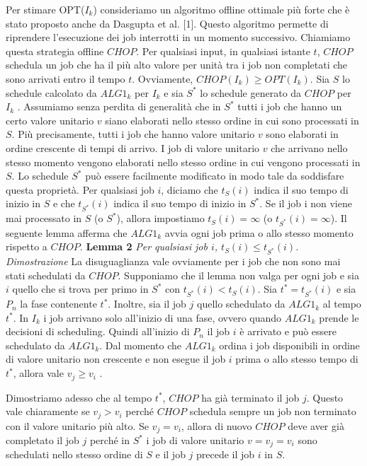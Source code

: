 \documentclass[twoside,openany,titlepage,fleqn,
	headinclude,12pt,a4paper,BCOR5mm,footinclude]{scrbook}
\begin{document}
Per stimare OPT($I_{k}$) consideriamo un algoritmo offline ottimale più forte che è stato proposto anche da Dasgupta et al. [1]. Questo algoritmo permette di riprendere l'esecuzione dei job interrotti in un momento successivo. Chiamiamo questa strategia offline $CHOP$. Per qualsiasi input, in qualsiasi istante $t$, $CHOP$ schedula un job che ha il più alto valore per unità tra i job non completati che sono arrivati entro il tempo $t$. Ovviamente, $CHOP(I_{k}) \geq OPT(I_{k})$. Sia $S$ lo schedule calcolato da $ALG1_{k}$ per $I_{k}$ e sia $S^{*}$ lo schedule generato da $CHOP$ per $I_{k}$ . Assumiamo senza perdita di generalità che in $S^{*}$ tutti i job che hanno un certo valore unitario $v$ siano elaborati nello stesso ordine in cui sono processati in $S$. Più precisamente, tutti i job che hanno valore unitario $v$ sono elaborati in ordine crescente di tempi di arrivo. I job di valore unitario $v$ che arrivano nello stesso momento vengono elaborati nello stesso ordine in cui vengono processati in $S$. Lo schedule $S^{*}$ può essere facilmente modificato in modo tale da soddisfare questa proprietà. Per qualsiasi job $i$, diciamo che $t_{S}(i)$ indica il suo tempo di inizio in $S$ e che $t_{S^{*}}(i)$ indica il suo tempo di inizio in $S^{*}$. Se il job i non viene mai processato in $S$ (o $S^{*}$), allora impostiamo $t_{S}(i) = \infty$ (o $t_{S^{*}} (i) = \infty$). Il seguente lemma afferma che $ALG1_{k}$ avvia ogni job prima o allo stesso momento rispetto a $CHOP$.\newline\newline
\textbf{Lemma 2} 
\textit{Per qualsiasi job $i$, $t_{S}(i) \leq t_{S^{*}}(i)$.}\newline\newline
\textit{Dimostrazione}
La disuguaglianza vale ovviamente per i job che non sono mai stati schedulati da $CHOP$. Supponiamo che il lemma non valga per ogni job e sia $i$ quello che si trova per primo in $S^{*}$ con $t_{S^{*}}(i) < t_{S}(i)$. Sia $t^{*} = t_{S^{*}} (i)$ e sia $P_{n}$ la fase contenente $t^{*}$. Inoltre, sia il job $j$ quello schedulato da $ALG1_{k}$ al tempo $t^{*}$. In $I_{k}$ i job arrivano solo all'inizio di una fase, ovvero quando $ALG1_{k}$ prende le decisioni di scheduling. Quindi all'inizio di $P_{n}$ il job $i$ è arrivato e può essere schedulato da $ALG1_{k}$. Dal momento che $ALG1_{k}$ ordina i job disponibili in ordine di valore unitario non crescente e non esegue il job $i$ prima o allo stesso tempo di $t^{*}$, allora vale $v_{j} \geq v_{i}$ . 

Dimostriamo adesso che al tempo $t^{*}$, $CHOP$ ha già terminato il job $j$. Questo vale chiaramente se $v_{j} > v_{i}$ perché $CHOP$ schedula sempre un job non terminato con il valore unitario più alto. Se $v_{j} = v_{i}$, allora di nuovo $CHOP$ deve aver già completato il job $j$ perché in $S^{*}$ i job di valore unitario $v = v_{j} = v_{i}$ sono schedulati nello stesso ordine di $S$ e il job $j$ precede il job $i$ in $S$. 
\end{document}
